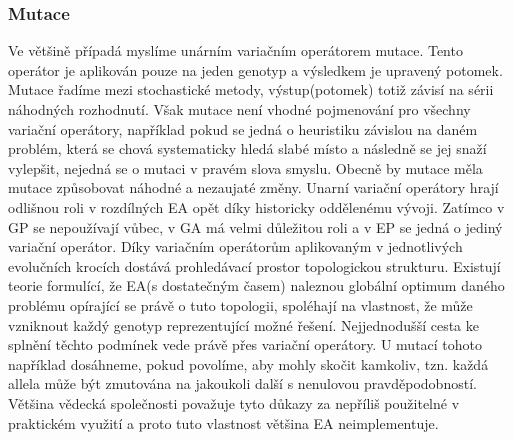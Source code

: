 \subsubsection{Mutace}
Ve většině případá myslíme unárním variačním operátorem mutace. Tento operátor je aplikován pouze na jeden genotyp a výsledkem je upravený potomek. Mutace řadíme mezi stochastické metody, výstup(potomek) totiž závisí na sérii náhodných rozhodnutí. Však mutace není vhodné pojmenování pro všechny variační operátory, například pokud se jedná o heuristiku závislou na daném problém, která se chová systematicky hledá slabé místo a následně se jej snaží vylepšit, nejedná se o mutaci v pravém slova smyslu. Obecně by mutace měla mutace způsobovat náhodné a nezaujaté změny. Unarní variační operátory hrají odlišnou roli v rozdílných EA opět díky historicky oddělenému vývoji. Zatímco v GP se nepoužívají vůbec, v GA má velmi důležitou roli a v EP se jedná o jediný variační operátor. Díky variačním operátorům aplikovaným v jednotlivých evolučních krocích dostává prohledávací prostor topologickou strukturu. Existují teorie formulící, že EA(s dostatečným časem) naleznou globální optimum daného problému opírající se právě o tuto topologii, spoléhají na vlastnost, že může vzniknout každý genotyp reprezentující možné řešení. Nejjednodušší cesta ke splnění těchto podmínek vede právě přes variační operátory. U mutací tohoto například dosáhneme, pokud povolíme, aby mohly skočit kamkoliv, tzn. každá allela může být zmutována na jakoukoli další s nenulovou pravděpodobností. Většina vědecká společnosti považuje tyto důkazy za nepříliš použitelné v praktickém využití a proto tuto vlastnost většina EA neimplementuje.  
